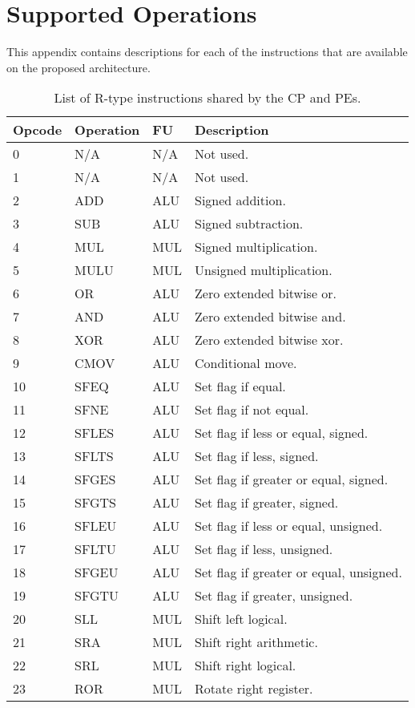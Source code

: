 \chapter{Supported Operations}\label{chapter:supported_operations}
This appendix contains descriptions for each of the instructions that are available on the proposed architecture.

\begin{table}[h]
\caption{List of R-type instructions shared by the CP and PEs.}
\begin{center}
\begin{tabular}{@{}p{}p{}p{}p{}@{}}
\toprule
\textbf{Opcode} & \textbf{Operation} & \textbf{FU} & \textbf{Description}\\ \hline
0 & N/A & N/A		& Not used. \\ 
1 & N/A & N/A		& Not used. \\ 
2 & ADD & ALU		& Signed addition. \\ 
3 & SUB & ALU		& Signed subtraction. \\ 
4 & MUL & MUL	& Signed multiplication. \\ 
5 & MULU & MUL	& Unsigned multiplication. \\ 
6 & OR & ALU		& Zero extended bitwise or. \\ 
7 & AND & ALU		& Zero extended bitwise and. \\ 
8 & XOR & ALU	& Zero extended bitwise xor. \\ 
9 & CMOV & ALU	& Conditional move. \\ 
10 & SFEQ & ALU	& Set flag if equal. \\ 
11 & SFNE & ALU	& Set flag if not equal. \\ 
12 & SFLES & ALU	& Set flag if less or equal, signed. \\ 
13 & SFLTS & ALU	& Set flag if less, signed. \\ 
14 & SFGES & ALU	& Set flag if greater or equal, signed. \\ 
15 & SFGTS & ALU	& Set flag if greater, signed. \\ 
16 & SFLEU & ALU	& Set flag if less or equal, unsigned. \\ 
17 & SFLTU & ALU	& Set flag if less, unsigned. \\ 
18 & SFGEU & ALU	& Set flag if greater or equal, unsigned. \\ 
19 & SFGTU & ALU	& Set flag if greater, unsigned. \\ 
20 & SLL & MUL	& Shift left logical. \\ 
21 & SRA & MUL	& Shift right arithmetic. \\ 
22 & SRL & MUL	& Shift right logical. \\ 
23 & ROR & MUL	& Rotate right register. \\ 
\bottomrule
\end{tabular}
\end{center}
\label{table:r_ops}
\end{table}%

